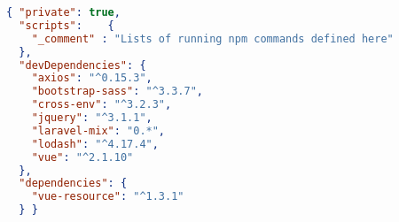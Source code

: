 \begin{lstlisting}[label=kode-sumber-package,language=json,caption=\textit{Script} \textit{package.json} Aplikasi]
{ "private": true,
  "scripts": 	{
	"_comment" : "Lists of running npm commands defined here"
  },
  "devDependencies": {
	"axios": "^0.15.3",
	"bootstrap-sass": "^3.3.7",
	"cross-env": "^3.2.3",
	"jquery": "^3.1.1",
	"laravel-mix": "0.*",
	"lodash": "^4.17.4",
	"vue": "^2.1.10"
  },
  "dependencies": {
	"vue-resource": "^1.3.1"
  } }
\end{lstlisting}